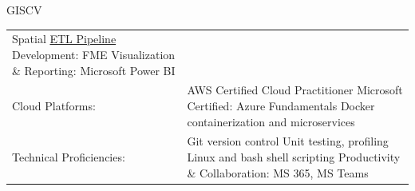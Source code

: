 \documentclass[letterpaper]{article}
\newenvironment{skillslist}
        {
            \hspace*{-0.07in}\begin{tabular}[t]{ l L{5.17in} }
        }{
            \end{tabular}
        }
\newcommand{\impt}[1]{\uline{#1}}
\begin{document}
\begin{taggedblock}{GISCV}
\begin{skillslist}
                Spatial \impt{ETL Pipeline} Development: FME \linebreak
                Visualization \& Reporting: Microsoft Power BI \linebreak
                \\
            Cloud Platforms:&
                AWS Certified Cloud Practitioner \linebreak
                Microsoft Certified: Azure Fundamentals \linebreak
                Docker containerization and microservices \linebreak
                \\
            Technical Proficiencies:&
                Git version control \linebreak
                Unit testing, profiling \linebreak
                Linux and bash shell scripting \linebreak
                Productivity \& Collaboration: MS 365, MS Teams
                \\
        \end{skillslist}
    \end{taggedblock}
\end{document}
